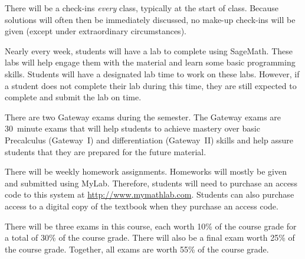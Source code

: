 \documentclass[11pt,letterpaper]{article}
\begin{document}


There will be a check-ins \textit{every} class, typically at the start of class. Because solutions will often then be immediately discussed, no make-up check-ins will be given (except under extraordinary circumstances). \pspace


Nearly every week, students will have a lab to complete using SageMath. These labs will help engage them with the material and learn some basic programming skills. Students will have a designated lab time to work on these labs. However, if a student does not complete their lab during this time, they are still expected to complete and submit the lab on time.
\pspace


There are two Gateway exams during the semester. The Gateway exams are 30~minute exams that will help students to achieve mastery over basic Precalculus (Gateway~I) and differentiation (Gateway~II) skills and help assure students that they are prepared for the future material. 
\pspace



\newpage



There will be weekly homework assignments. Homeworks will mostly be given and submitted using MyLab. Therefore, students will need to purchase an access code to this system at \url{http://www.mymathlab.com}. Students can also purchase access to a digital copy of the textbook when they purchase an access code.
\pspace


There will be three exams in this course, each worth 10\% of the course grade for a total of 30\% of the course grade. There will also be a final exam worth 25\% of the course grade. Together, all exams are worth 55\% of the course grade. 
\pspace
\end{document}
